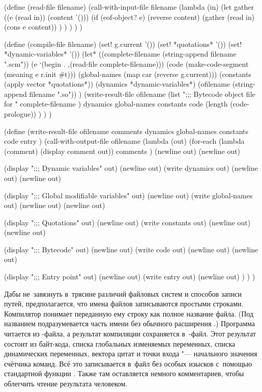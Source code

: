 \begin{code:lisp}
(define (read-file filename)
  (call-with-input-file filename
    (lambda (in)
      (let gather ((e (read in)) (content '()))
        (if (eof-object? e)
            (reverse content)
            (gather (read in) (cons e content)) ) ) ) ) )

(define (compile-file filename)
  (set! g.current '())
  (set! *quotations* '())
  (set! *dynamic-variables* '())
  (let* ((complete-filename (string-append filename ".scm"))
         (e                 `(begin . ,(read-file complete-filename)))
         (code              (make-code-segment (meaning e r.init #t)))
         (global-names      (map car (reverse g.current)))
         (constants         (apply vector *quotations*))
         (dynamics          *dynamic-variables*)
         (ofilename         (string-append filename ".so")) )
    (write-result-file ofilename
                       (list ";;; Bytecode object file for "
                             complete-filename )
                       dynamics global-names constants code
                       (length (code-prologue)) ) ) )

(define (write-result-file ofilename comments dynamics
                           global-names constants code entry )
  (call-with-output-file ofilename
    (lambda (out)
      (for-each (lambda (comment) (display comment out))
                comments ) (newline out) (newline out)

      (display ";;; Dynamic variables" out) (newline out)
      (write dynamics out) (newline out) (newline out)

      (display ";;; Global modifiable variables" out) (newline out)
      (write global-names out) (newline out) (newline out)

      (display ";;; Quotations" out) (newline out)
      (write constants out) (newline out) (newline out)

      (display ";;; Bytecode" out) (newline out)
      (write code out) (newline out) (newline out)

      (display ";;; Entry point" out) (newline out)
      (write entry out) (newline out) ) ) )
\end{code:lisp}

Дабы не~завязнуть в~трясине различий файловых систем и способов записи путей,
предполагается, что имена файлов записываются простыми строками. Компилятор
понимает переданную ему строку как полное название файла. (Под названием
подразумевается часть имени без обычного расширения .) Программа
читается из -файла, а результат компиляции сохраняется
в~-файл. Этот результат состоит из байт-кода, списка глобальных
изменяемых переменных, списка динамических переменных, вектора цитат и точки
входа "--- начального значения счётчика команд. Всё это записывается в~файл без
особых изысков с~помощью стандартной функции . Также там оставляется
немного комментариев, чтобы облегчить чтение результата человеком.

